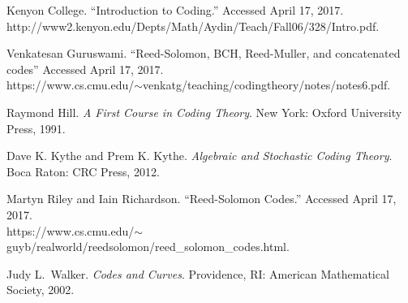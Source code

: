 \documentclass[11pt]{article}
\begin{document}
\newpage
\begin{thebibliography}{5}

Kenyon College. ``Introduction to Coding.'' Accessed April 17, 2017. http://www2.kenyon.edu/Depts/Math/Aydin/Teach/Fall06/328/Intro.pdf.

Venkatesan Guruswami. ``Reed-Solomon, BCH, Reed-Muller, and concatenated codes'' Accessed April 17, 2017.\\
https://www.cs.cmu.edu/$\sim$venkatg/teaching/codingtheory/notes/notes6.pdf.

Raymond Hill.
\textit{A First Course in Coding Theory}. New York: Oxford University Press, 1991.

Dave K. Kythe and Prem K. Kythe.
\textit{Algebraic and Stochastic Coding Theory}. Boca Raton: CRC Press, 2012.

Martyn Riley and Iain Richardson.
``Reed-Solomon Codes.'' Accessed April 17, 2017.\\ https://www.cs.cmu.edu/$\sim$guyb/realworld/reedsolomon/reed\_solomon\_codes.html.

Judy L. Walker.
\textit{Codes and Curves}. Providence, RI: American Mathematical Society, 2002.

\end{thebibliography}
\end{document}
